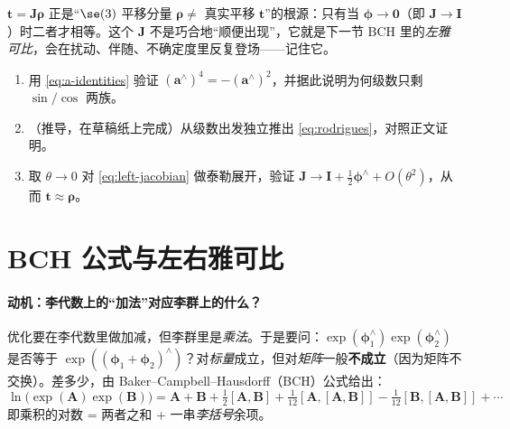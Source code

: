 \begin{insight}
$\mathbf{t}=\mathbf{J}\boldsymbol{\rho}$ 正是“$\se(3)$ 平移分量 $\boldsymbol{\rho}\neq$ 真实平移 $\mathbf{t}$”的根源：只有当 $\boldsymbol{\phi}\to\mathbf{0}$（即 $\mathbf{J}\to\mathbf{I}$）时二者才相等。这个 $\mathbf{J}$ 不是巧合地“顺便出现”，它就是下一节 BCH 里的\emph{左雅可比}，会在扰动、伴随、不确定度里反复登场——记住它。
\end{insight}

\begin{practice}
\begin{enumerate}
  \item 用 \cref{eq:a-identities} 验证 $(\mathbf{a}^\wedge)^4=-(\mathbf{a}^\wedge)^2$，并据此说明为何级数只剩 $\sin/\cos$ 两族。
  \item （推导，在草稿纸上完成）从级数出发独立推出 \cref{eq:rodrigues}，对照正文证明。
  \item 取 $\theta\to0$ 对 \cref{eq:left-jacobian} 做泰勒展开，验证 $\mathbf{J}\to\mathbf{I}+\tfrac12\boldsymbol{\phi}^\wedge+O(\theta^2)$，从而 $\mathbf{t}\approx\boldsymbol{\rho}$。
\end{enumerate}
\end{practice}

\section{BCH 公式与左右雅可比}
\label{sec:bch}

\paragraph{动机：李代数上的“加法”对应李群上的什么？}
优化要在李代数里做加减，但李群里是\emph{乘法}。于是要问：$\exp(\boldsymbol{\phi}_1^\wedge)\exp(\boldsymbol{\phi}_2^\wedge)$ 是否等于 $\exp((\boldsymbol{\phi}_1+\boldsymbol{\phi}_2)^\wedge)$？对\emph{标量}成立，但对\emph{矩阵}一般\textbf{不成立}（因为矩阵不交换）。差多少，由 Baker–Campbell–Hausdorff（BCH）公式给出：
\begin{equation}
  \ln\big(\exp(\mathbf{A})\exp(\mathbf{B})\big)=\mathbf{A}+\mathbf{B}+\tfrac12[\mathbf{A},\mathbf{B}]+\tfrac1{12}[\mathbf{A},[\mathbf{A},\mathbf{B}]]-\tfrac1{12}[\mathbf{B},[\mathbf{A},\mathbf{B}]]+\cdots
  \label{eq:bch}
\end{equation}
即乘积的对数 = 两者之和 + 一串\emph{李括号}余项。

